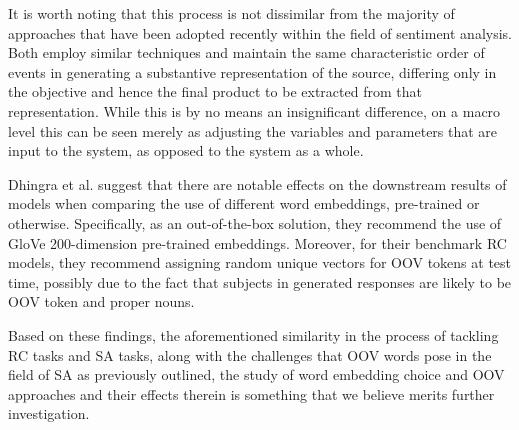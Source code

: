 \documentclass[../../fyp.tex]{subfiles}
\begin{document}
It is worth noting that this process is not dissimilar from the majority of approaches that have been adopted recently within the field of sentiment analysis. Both employ similar techniques and maintain the same characteristic order of events in generating a substantive representation of the source, differing only in the objective and hence the final product to be extracted from that representation. While this is by no means an insignificant difference, on a macro level this can be seen merely as adjusting the variables and parameters that are input to the system, as opposed to the system as a whole.

Dhingra et al. \cite{bhuwandhingra2017} suggest that there are notable effects on the downstream results of models when comparing the use of different word embeddings, pre-trained or otherwise. Specifically, as an out-of-the-box solution, they recommend the use of GloVe \cite{pennington} 200-dimension pre-trained embeddings. Moreover, for their benchmark RC models, they recommend assigning random unique vectors for OOV tokens at test time, possibly due to the fact that subjects in generated responses are likely to be OOV token and proper nouns.

Based on these findings, the aforementioned similarity in the process of tackling RC tasks and SA tasks, along with the challenges that OOV words pose in the field of SA as previously outlined, the study of word embedding choice and OOV approaches and their effects therein is something that we believe merits further investigation.
\end{document}
